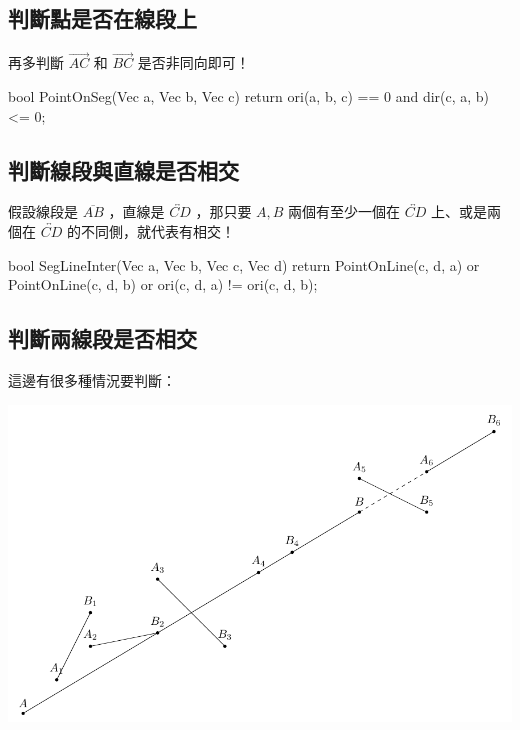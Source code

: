 \documentclass[main.tex]{subfiles}
\begin{document}
\subsection{判斷點是否在線段上}

再多判斷 $\vec{AC}$ 和 $\vec{BC}$ 是否非同向即可！

\begin{C++}
bool PointOnSeg(Vec a, Vec b, Vec c)
{ return ori(a, b, c) == 0 and dir(c, a, b) <= 0; }
\end{C++}

\subsection{判斷線段與直線是否相交}

假設線段是 $\overline{AB}$ ，直線是 $\overleftrightarrow{CD}$ ，那只要 $A, B$ 兩個有至少一個在 $\overleftrightarrow{CD}$ 上、或是兩個在 $\overleftrightarrow{CD}$ 的不同側，就代表有相交！

\begin{C++}
bool SegLineInter(Vec a, Vec b, Vec c, Vec d) {
	return PointOnLine(c, d, a) or PointOnLine(c, d, b)
		or ori(c, d, a) != ori(c, d, b);
}
\end{C++}

\subsection{判斷兩線段是否相交}

這邊有很多種情況要判斷：

\begin{center}
	\includegraphics*{images/Geometry/Basic/SegInter.pdf}
\end{center}
\end{document}
